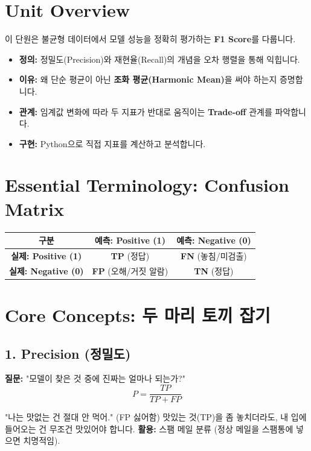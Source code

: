 \documentclass[11pt,a4paper]{book}
\theoremstyle{definition}
\begin{document}
\section{Unit Overview}
\begin{summarybox}[title={핵심 목표}]
이 단원은 불균형 데이터에서 모델 성능을 정확히 평가하는 \textbf{F1 Score}를 다룹니다.
\begin{itemize}
    \item \textbf{정의:} 정밀도(Precision)와 재현율(Recall)의 개념을 오차 행렬을 통해 익힙니다.
    \item \textbf{이유:} 왜 단순 평균이 아닌 \textbf{조화 평균(Harmonic Mean)}을 써야 하는지 증명합니다.
    \item \textbf{관계:} 임계값 변화에 따라 두 지표가 반대로 움직이는 \textbf{Trade-off} 관계를 파악합니다.
    \item \textbf{구현:} Python으로 직접 지표를 계산하고 분석합니다.
\end{itemize}
\end{summarybox}

\section{Essential Terminology: Confusion Matrix}
\begin{center}
\begin{tabular}{|c|c|c|}
\hline
\textbf{구분} & \textbf{예측: Positive (1)} & \textbf{예측: Negative (0)} \\ \hline
\textbf{실제: Positive (1)} & \textbf{TP} (정답) & \textbf{FN} (놓침/미검출) \\ \hline
\textbf{실제: Negative (0)} & \textbf{FP} (오해/거짓 알람) & \textbf{TN} (정답) \\ \hline
\end{tabular}
\end{center}

\section{Core Concepts: 두 마리 토끼 잡기}

\subsection{1. Precision (정밀도)}

\textbf{질문:} "모델이 찾은 것 중에 진짜는 얼마나 되는가?"
$$ P = \frac{TP}{TP + FP} $$
\begin{analogybox}[title={깐깐한 미식가}]
"나는 맛없는 건 절대 안 먹어." (FP 싫어함)
맛있는 것(TP)을 좀 놓치더라도, 내 입에 들어오는 건 무조건 맛있어야 합니다.
\textbf{활용:} 스팸 메일 분류 (정상 메일을 스팸통에 넣으면 치명적임).
\end{analogybox}
\end{document}
